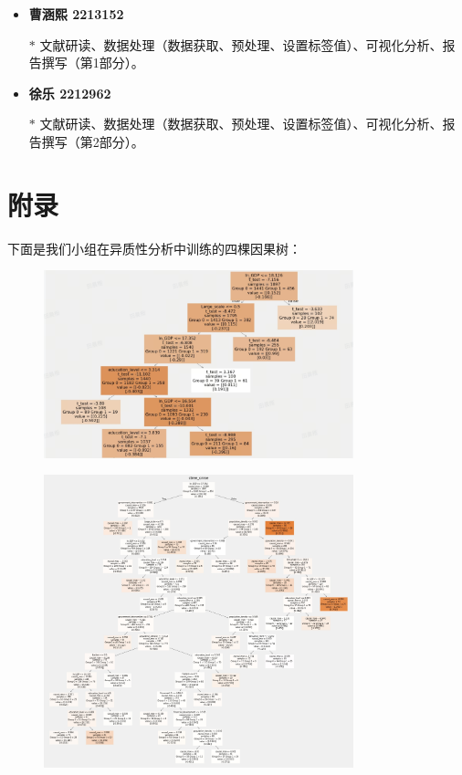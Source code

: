 \documentclass[a4paper,12pt]{article}
\begin{document}
\begin{itemize}
    \item \textbf{曹涵熙 2213152}
    \item[$\ast$]文献研读、数据处理（数据获取、预处理、设置标签值）、可视化分析、报告撰写（第1部分）。
\end{itemize}

\begin{itemize}
    \item \textbf{徐乐 2212962}
    \item[$\ast$]文献研读、数据处理（数据获取、预处理、设置标签值）、可视化分析、报告撰写（第2部分）。
\end{itemize}

\newpage
\section{附录}

下面是我们小组在异质性分析中训练的四棵因果树：

\begin{figure}[H]
    \centering
    \includegraphics[width=0.8\textwidth]{Tree1.png}   
\end{figure}


\begin{figure}[H]
    \centering
    \includegraphics[width=0.8\textwidth]{Tree2.png}   
\end{figure}
\end{document}
